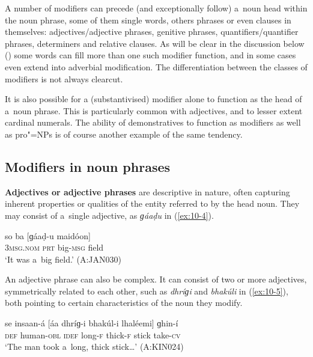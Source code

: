 A number of modifiers can precede (and exceptionally follow) a~noun head within the noun phrase, some of them single words, others phrases or even clauses in themselves: adjectives/adjective phrases, genitive phrases, quantifiers/quantifier phrases, determiners and relative clauses. As will be clear in the discussion below () some words can fill more than one such modifier function, and in some cases even extend into adverbial modification. The differentiation between the classes of modifiers is not always clearcut.


It is also possible for a (substantivised) modifier alone to function as the head of a~noun phrase. This is particularly common with adjectives, and to lesser extent cardinal numerals. The ability of demonstratives to function as modifiers as well as pro"=NPs is of course another example of the same tendency.


\subsection{Modifiers in noun phrases}
\label{subsec:10-1-2}


\textbf{Adjectives or adjective phrases} are descriptive in nature, often capturing inherent properties or qualities of the entity referred to by the head noun. They may consist of a~single adjective, as \textit{ɡáaḍu} in (\ref{ex:10-4}).

\begin{exe}
\ex
\label{ex:10-4}
\gll so ba [ɡáaḍ-u maidóon] \\
\textsc{3msg.nom} \textsc{prt} big-\textsc{msg} field \\
\glt `It was a~big field.' (A:JAN030)
\end{exe}

An adjective phrase can also be complex. It can consist of two or more adjectives, symmetrically related to each other, such as \textit{dhríɡi} and \textit{bhakúli} in (\ref{ex:10-5}), both pointing to certain characteristics of the noun they modify. 

\begin{exe}
\ex
\label{ex:10-5}
\gll se insaan-á [áa dhríɡ-i bhakúl-i lhaléemi] ɡhin-í \\
\textsc{def} human-\textsc{obl} \textsc{idef} long-\textsc{f} thick-\textsc{f} stick  take-\textsc{cv} \\
\glt `The man took a~long, thick stick{\ldots}' (A:KIN024)
\end{exe}

